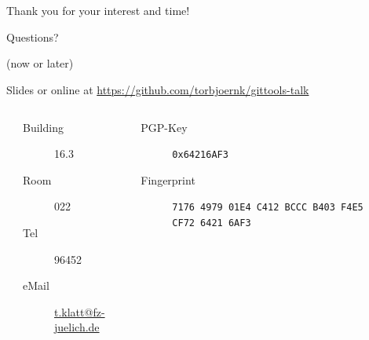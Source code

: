 \documentclass[english,hyperref={pdfpagelabels=false},aspectratio=1610]{beamer}
\begin{document}
\begin{frame}
  \frametitle{~}
  \begin{center}
    {\huge Thank you for your interest and time!}\par
    \bigskip
    \bigskip
    \bigskip
    {\Large Questions?}\par
    {\scriptsize\color{fzjgray50}(now or later)}\par
    \bigskip
    {\scriptsize Slides or online at \url{https://github.com/torbjoernk/gittools-talk}}
    \bigskip
    \begin{columns}
      \tiny
      \begin{column}{0.1\textwidth}
      \end{column}
      \begin{column}{0.4\textwidth}
        \begin{description}
          \item[Building] 16.3
          \item[Room] 022
          \item[Tel] 96452
          \item[eMail] \href{mailto:t.klatt@fz-juelich.de}{t.klatt@fz-juelich.de}
        \end{description}
      \end{column}
      \begin{column}{0.38\textwidth}
        \begin{description}
          \item[PGP-Key] \texttt{0x64216AF3}
          \item[Fingerprint] \texttt{7176 4979 01E4 C412 BCCC B403 F4E5 CF72 6421 6AF3}
        \end{description}
      \end{column}
      \begin{column}{0.12\textwidth}
      \end{column}
    \end{columns}
  \end{center}
\end{frame}
\end{document}
